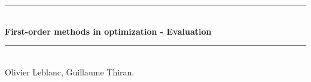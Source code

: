 \documentclass[10pt]{article}
\theoremstyle{definition}
\newcommand{\HRule}{\rule{\linewidth}{0.5mm}}
\begin{document}
\begin{center} %
 

\HRule \\[0.2cm]
{ \huge \bfseries First-order methods in optimization - Evaluation }\\[0.1cm] %
\HRule \\[0.4cm]
 
Olivier Leblanc, Guillaume Thiran. \\



\end{center}






\end{document}
